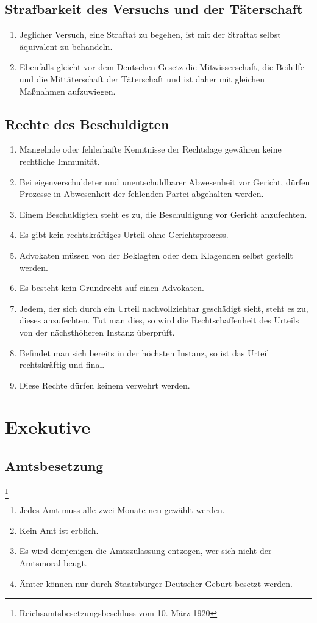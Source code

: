 \documentclass{article}
\begin{document}
\subsection{Strafbarkeit des Versuchs und der Täterschaft}
\begin{enumerate}[(1)]
    \item Jeglicher Versuch, eine Straftat zu begehen, ist mit der Straftat selbst äquivalent zu behandeln.
    \item Ebenfalls gleicht vor dem Deutschen Gesetz die Mitwisserschaft, die Beihilfe und die Mittäterschaft der Täterschaft und ist daher mit gleichen Maßnahmen aufzuwiegen.
\end{enumerate}

\subsection{Rechte des Beschuldigten}
\begin{enumerate}[(1)]
    \item Mangelnde oder fehlerhafte Kenntnisse der Rechtslage gewähren keine rechtliche Immunität.
    \item Bei eigenverschuldeter und unentschuldbarer Abwesenheit vor Gericht, dürfen Prozesse in Abwesenheit der fehlenden Partei abgehalten werden.
    \item Einem Beschuldigten steht es zu, die Beschuldigung vor Gericht anzufechten.
    \item Es gibt kein rechtskräftiges Urteil ohne Gerichtsprozess.
    \item Advokaten müssen von der Beklagten oder dem Klagenden selbst gestellt werden.
    \item Es besteht kein Grundrecht auf einen Advokaten.
    \item Jedem, der sich durch ein Urteil nachvollziehbar geschädigt sieht, steht es zu, dieses anzufechten. Tut man dies, so wird die Rechtschaffenheit des Urteils von der nächsthöheren Instanz überprüft.
    \item Befindet man sich bereits in der höchsten Instanz, so ist das Urteil rechtskräftig und final.
    \item Diese Rechte dürfen keinem verwehrt werden.
\end{enumerate}

\section{Exekutive}
\subsection{Amtsbesetzung}\footnote{Reichsamtsbesetzungsbeschluss vom 10. März 1920}
\begin{enumerate}[(1)]
    \item Jedes Amt muss alle zwei Monate neu gewählt werden.
    \item Kein Amt ist erblich.
    \item Es wird demjenigen die Amtszulassung entzogen, wer sich nicht der Amtsmoral beugt.
    \item Ämter können nur durch Staatsbürger Deutscher Geburt besetzt werden.
\end{enumerate}
\end{document}
